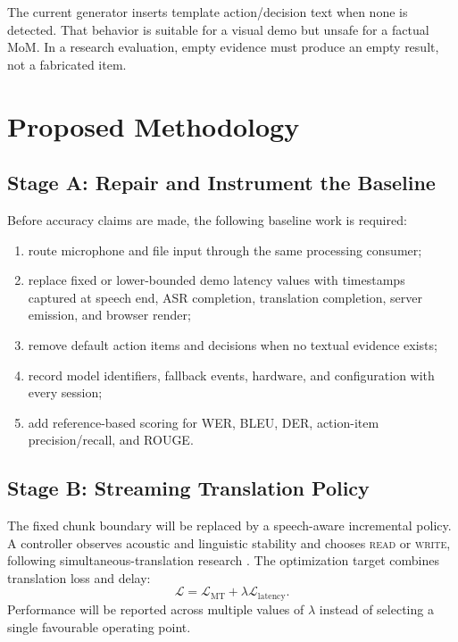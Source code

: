 \documentclass[conference]{IEEEtran}
\begin{document}
The current generator inserts template action/decision text when none is detected. That behavior is suitable for a visual demo but unsafe for a factual MoM. In a research evaluation, empty evidence must produce an empty result, not a fabricated item.

\section{Proposed Methodology}

\subsection{Stage A: Repair and Instrument the Baseline}
Before accuracy claims are made, the following baseline work is required:
\begin{enumerate}
    \item route microphone and file input through the same processing consumer;
    \item replace fixed or lower-bounded demo latency values with timestamps captured at speech end, ASR completion, translation completion, server emission, and browser render;
    \item remove default action items and decisions when no textual evidence exists;
    \item record model identifiers, fallback events, hardware, and configuration with every session;
    \item add reference-based scoring for WER, BLEU, DER, action-item precision/recall, and ROUGE.
\end{enumerate}

\subsection{Stage B: Streaming Translation Policy}
The fixed chunk boundary will be replaced by a speech-aware incremental policy. A controller observes acoustic and linguistic stability and chooses \textsc{read} or \textsc{write}, following simultaneous-translation research \cite{ma2019stacl,zhao2023adaptive}. The optimization target combines translation loss and delay:
\begin{equation}
\mathcal{L}=\mathcal{L}_{\mathrm{MT}}+\lambda\mathcal{L}_{\mathrm{latency}}.
\end{equation}
Performance will be reported across multiple values of $\lambda$ instead of selecting a single favourable operating point.
\end{document}
